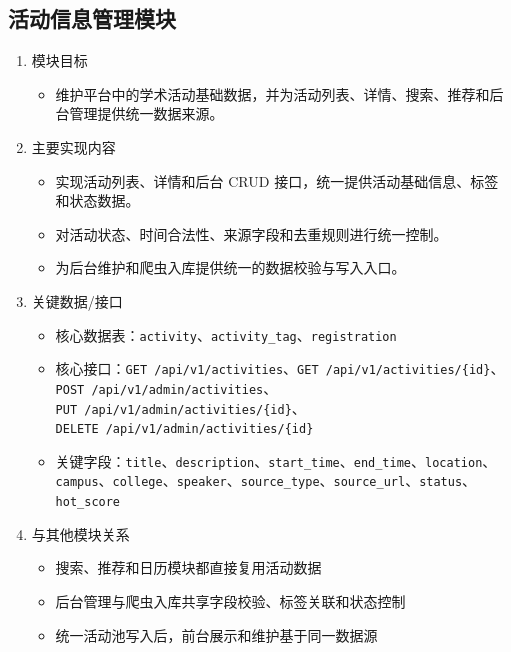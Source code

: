 \documentclass[UTF8,a4paper,12pt,fontset=none]{ctexrep}
\providecommand{\tightlist}{}
\begin{document}
\subsection{活动信息管理模块}\label{ux6d3bux52a8ux4fe1ux606fux7ba1ux7406ux6a21ux5757}

\begin{enumerate}
\def\labelenumi{\arabic{enumi}.}
\item
  模块目标

  \begin{itemize}
  \tightlist
  \item
    维护平台中的学术活动基础数据，并为活动列表、详情、搜索、推荐和后台管理提供统一数据来源。
  \end{itemize}
\item
  主要实现内容

  \begin{itemize}
  \tightlist
  \item
    实现活动列表、详情和后台 CRUD 接口，统一提供活动基础信息、标签和状态数据。
  \item
    对活动状态、时间合法性、来源字段和去重规则进行统一控制。
  \item
    为后台维护和爬虫入库提供统一的数据校验与写入入口。
  \end{itemize}
\item
  关键数据/接口

  \begin{itemize}
  \tightlist
  \item
    核心数据表：\texttt{activity}、\texttt{activity\_tag}、\texttt{registration}
  \item
    核心接口：\texttt{GET\ /api/v1/activities}、\texttt{GET\ /api/v1/activities/\{id\}}、\texttt{POST\ /api/v1/admin/activities}、\texttt{PUT\ /api/v1/admin/activities/\{id\}}、\texttt{DELETE\ /api/v1/admin/activities/\{id\}}
  \item
    关键字段：\texttt{title}、\texttt{description}、\texttt{start\_time}、\texttt{end\_time}、\texttt{location}、\texttt{campus}、\texttt{college}、\texttt{speaker}、\texttt{source\_type}、\texttt{source\_url}、\texttt{status}、\texttt{hot\_score}
  \end{itemize}
\item
  与其他模块关系

  \begin{itemize}
  \tightlist
  \item
    搜索、推荐和日历模块都直接复用活动数据
  \item
    后台管理与爬虫入库共享字段校验、标签关联和状态控制
  \item
    统一活动池写入后，前台展示和维护基于同一数据源
  \end{itemize}
\end{enumerate}
\end{document}
